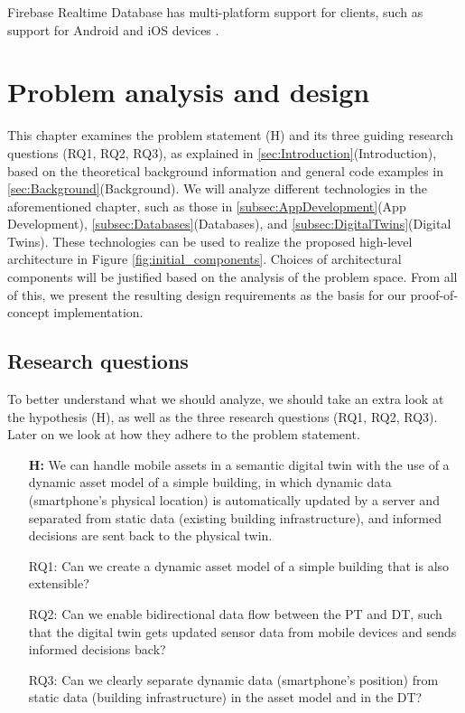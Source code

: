 \documentclass{article}
\begin{document}
Firebase Realtime Database has multi-platform support for clients, such as support for Android and iOS devices \cite{noauthor_firebase_nodate}.



\newpage
\section{Problem analysis and design}\label{sec:Analysis}
This chapter examines the problem statement (H) and its three guiding research questions (RQ1, RQ2, RQ3), as explained in \ref{sec:Introduction}(Introduction), based on the theoretical background information and general code examples in \ref{sec:Background}(Background). We will analyze different technologies in the aforementioned chapter, such as those in \ref{subsec:AppDevelopment}(App Development), \ref{subsec:Databases}(Databases), and \ref{subsec:DigitalTwins}(Digital Twins). These technologies can be used to realize the proposed high-level architecture in Figure \ref{fig:initial_components}. Choices of architectural components will be justified based on the analysis of the problem space. From all of this, we present the resulting design requirements as the basis for our proof-of-concept implementation.

\subsection{Research questions}
To better understand what we should analyze, we should take an extra look at the hypothesis (H), as well as the three research questions (RQ1, RQ2, RQ3). Later on we look at how they adhere to the problem statement.

\begin{itemize}
    \item[\textbf{H:}] We can handle mobile assets in a semantic digital twin with the use of a dynamic asset model of a simple building, in which dynamic data (smartphone's physical location) is automatically updated by a server and separated from static data (existing building infrastructure), and informed decisions are sent back to the physical twin.
    \item[RQ1:]
    Can we create a dynamic asset model of a simple building that is also extensible?
    \item [RQ2:] 
    Can we enable bidirectional data flow between the PT and DT, such that the digital twin gets updated sensor data from mobile devices and sends informed decisions back?
    \item [RQ3:]
    Can we clearly separate dynamic data (smartphone's position) from static data (building infrastructure) in the asset model and in the DT?
\end{itemize} 
\end{document}

